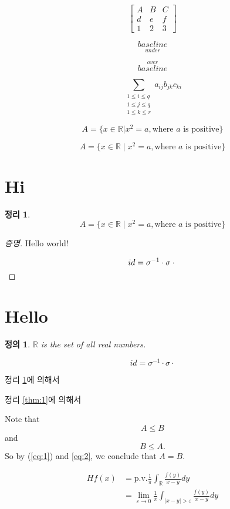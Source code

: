 \documentclass{oblivoir}
\newtheorem{defn}{정의}
\newtheorem{thm}{정리}[section]
\theoremstyle{definition}
\begin{document}
\[\begin{bmatrix}
A & B & C \\
d & e & f \\
1 & 2 & 3
\end{bmatrix}
\]

\[ \underset{under}{baseline} \]

\[ \overset{over}{baseline} \]

\[\sum_{\substack{1 \leq i \leq  q\\
1 \leq j \leq q \\
1 \leq k \leq r}
} a_{ij} b_{jk} c_{ki}
\]

\[ A=\{ x \in \mathbb{R} | x^2=a, \text{where $a$ is positive}\} \]

\[ A=\{ x \in \mathbb{R} \mid x^2=a, \text{where $a$ is positive} \} \]

\section{Hi}
\begin{thm} \label{thm:1}
\[ A=\{ x \in \mathbb{R} \mid x^2=a, \text{where $a$ is positive} \} \]
\end{thm}
\begin{proof}[증명]
Hello world!

\[ id = \sigma^{-1} \cdot \sigma \cdot \qedhere \]
\end{proof}

\section{Hello}
\begin{defn}
$\mathbb{R}$ is the set of all real numbers.
\end{defn}

\[ id = \sigma^{-1} \cdot \sigma \cdot \]

정리 \ref{thm:1}에 의해서

정리 \eqref{thm:1}에 의해서

Note that
\begin{equation} \label{eq:1}
A \leq B
\end{equation}
and
\begin{equation} \label{eq:2}
B \leq A.
\end{equation}
So by (\ref{eq:1}) and \eqref{eq:2}, we conclude that $A=B$.

\begin{equation}
\begin{split}
Hf(x) &= \mathrm{p.v.}\frac{1}{\pi} \int_{\mathbb{R}} \frac{f(y)}{x-y}dy\\
&= \lim_{\varepsilon \rightarrow 0} \frac{1}{\pi} \int_{|x-y|>\varepsilon} \frac{f(y)}{x-y}dy
\end{split}
\end{equation}
\end{document}
